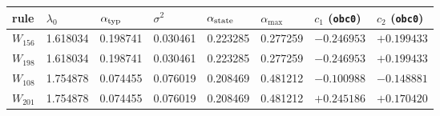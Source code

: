 \begin{tabular}{llllllll}
\toprule
rule & $\lambda_0$ & $\alpha_{\rm typ}$ & $\sigma^2$ & $\alpha_{\rm state}$ & $\alpha_{\max}$ & $c_1$ (\texttt{obc0}) & $c_2$ (\texttt{obc0}) \\
\midrule
$W_{156}$ & 1.618034 & 0.198741 & 0.030461 & 0.223285 & 0.277259 & $-0.246953$ & $+0.199433$ \\
$W_{198}$ & 1.618034 & 0.198741 & 0.030461 & 0.223285 & 0.277259 & $-0.246953$ & $+0.199433$ \\
$W_{108}$ & 1.754878 & 0.074455 & 0.076019 & 0.208469 & 0.481212 & $-0.100988$ & $-0.148881$ \\
$W_{201}$ & 1.754878 & 0.074455 & 0.076019 & 0.208469 & 0.481212 & $+0.245186$ & $+0.170420$ \\
\bottomrule
\end{tabular}
